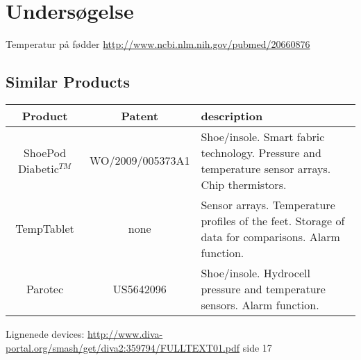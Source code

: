 \chapter{Undersøgelse}
Temperatur på fødder \url{http://www.ncbi.nlm.nih.gov/pubmed/20660876}\\



\section{Similar Products}
\begin{table}[H]
\begin{tabular}{|c|c|p{9cm}|}
\hline
Product & Patent & description\\ \hline
ShoePod Diabetic$^{TM}$ & WO/2009/005373A1 & Shoe/insole. Smart fabric technology. Pressure and temperature sensor arrays. Chip thermistors. \\ \hline
TempTablet & none & Sensor arrays. Temperature profiles of the feet. Storage of data for comparisons. Alarm function. \\ \hline
Parotec & US5642096 & Shoe/insole. Hydrocell pressure and temperature sensors. Alarm function. \\ \hline
\end{tabular}
\end{table}
Lignenede devices: \url{http://www.diva-portal.org/smash/get/diva2:359794/FULLTEXT01.pdf} side 17\\
